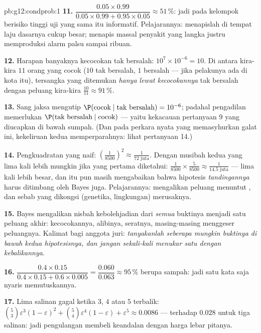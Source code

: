 \begin{solution}{pb:g12:condprob:1}
\textbf{11.} $\dfrac{0.05 \times 0.99}{0.05 \times 0.99 +
0.95 \times 0.05} \approx 51\,\%$: jadi pada kelompok berisiko tinggi
uji yang sama itu informatif. Pelajarannya: menapislah di tempat laju dasarnya
cukup besar; menapis massal penyakit yang langka justru memproduksi
alarm palsu sampai ribuan.

\textbf{12.} Harapan banyaknya kecocokan tak bersalah:
$10^7 \times 10^{-6} = 10$. Di antara kira-kira $11$ orang yang cocok
($10$ tak bersalah, $1$ bersalah --- jika pelakunya ada di
kota itu), tersangka yang ditemukan \emph{hanya lewat kecocokannya}
tak bersalah dengan peluang kira-kira $\frac{10}{11} \approx
91\,\%$.

\textbf{13.} Sang jaksa mengutip
$\P(\text{cocok} \mid \text{tak bersalah}) = 10^{-6}$; padahal pengadilan
memerlukan $\P(\text{tak bersalah} \mid \text{cocok})$ --- yaitu kekacauan pertanyaan
9 yang diucapkan di bawah sumpah. (Dan pada perkara nyata yang
memasyhurkan galat ini, kekeliruan kedua memperparahnya:
lihat pertanyaan 14.)

\textbf{14.} Pengkuadratan yang naif: $\left(\frac{1}{8500}\right)^2
\approx \frac{1}{72 \text{ juta}}$. Dengan musibah kedua
yang lima kali lebih mungkin jika yang pertama diketahui:
$\frac{1}{8500} \times \frac{5}{8500} \approx
\frac{1}{14.5 \text{ juta}}$ --- lima kali lebih besar, dan
itu pun masih mengabaikan bahwa hipotesis \emph{tandingannya} harus
ditimbang oleh Bayes juga. Pelajarannya: mengalikan peluang
menuntut , dan sebab yang dikongsi (genetika,
lingkungan) merusaknya.

\textbf{15.} Bayes mengalikan nisbah kebolehjadian dari
\emph{semua} buktinya menjadi satu peluang akhir: kecocokannya, alibinya,
seratnya, masing-masing menggeser peluangnya. Kalimat bagi anggota juri:
\emph{tanyakanlah seberapa mungkin buktinya di bawah kedua
hipotesisnya, dan jangan sekali-kali menukar satu  dengan
kebalikannya}.

\textbf{16.} $\dfrac{0.4 \times 0.15}{0.4 \times 0.15 +
0.6 \times 0.005} = \dfrac{0.060}{0.063} \approx 95\,\%$
berupa sampah: jadi satu kata saja nyaris memutuskannya.

\textbf{17.} Lima salinan gagal ketika $3$, $4$ atau $5$ terbalik:
$\binom53 \varepsilon^3(1-\varepsilon)^2 + \binom54
\varepsilon^4 (1 - \varepsilon) + \varepsilon^5 \approx
0.0086$ --- terhadap $0.028$ untuk tiga salinan: jadi pengulangan
membeli keandalan dengan harga lebar pitanya.


\end{solution}
